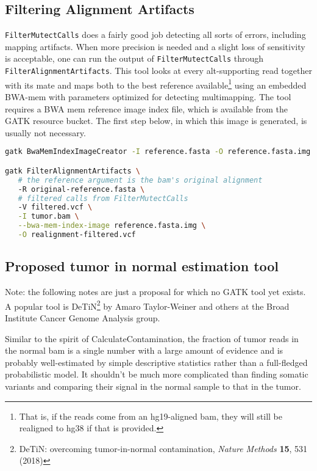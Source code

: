 \documentclass[nofootinbib,amssymb,amsmath]{revtex4}
\newcommand{\code}[1]{\texttt{#1}}
\begin{document}
\subsection{Filtering Alignment Artifacts}
\code{FilterMutectCalls} does a fairly good job detecting all sorts of errors, including mapping artifacts.  When more precision is needed and a slight loss of sensitivity is acceptable, one can run the output of \code{FilterMutectCalls} through \code{FilterAlignmentArtifacts}.  This tool looks at every alt-supporting read together with its mate and maps both to the best reference available\footnote{That is, if the reads come from an hg19-aligned bam, they will still be realigned to hg38 if that is provided.} using an embedded BWA-mem with parameters optimized for detecting multimapping.  The tool requires a BWA mem reference image index file, which is available from the GATK resource bucket.  The first step below, in which this image is generated, is usually not necessary.

\begin{lstlisting}[language=bash,caption={FilterAlignmentArtifacts command}, label={cmd-filter-alignment-artifacts}]
gatk BwaMemIndexImageCreator -I reference.fasta -O reference.fasta.img

gatk FilterAlignmentArtifacts \
   # the reference argument is the bam's original alignment
   -R original-reference.fasta \
   # filtered calls from FilterMutectCalls
   -V filtered.vcf \
   -I tumor.bam \
   --bwa-mem-index-image reference.fasta.img \
   -O realignment-filtered.vcf
\end{lstlisting}


\subsection{Proposed tumor in normal estimation tool}

Note: the following notes are just a proposal for which no GATK tool yet exists.  A popular tool is DeTiN\footnote{DeTiN: overcoming tumor-in-normal contamination, \textit{Nature Methods} \textbf{15}, 531 (2018)} by Amaro Taylor-Weiner and others at the Broad Institute Cancer Genome Analysis group.

Similar to the spirit of CalculateContamination, the fraction of tumor reads in the normal bam is a single number with a large amount of evidence and is probably well-estimated by simple descriptive statistics rather than a full-fledged probabilistic model.  It shouldn't be much more complicated than finding somatic variants and comparing their signal in the normal sample to that in the tumor.
\end{document}

